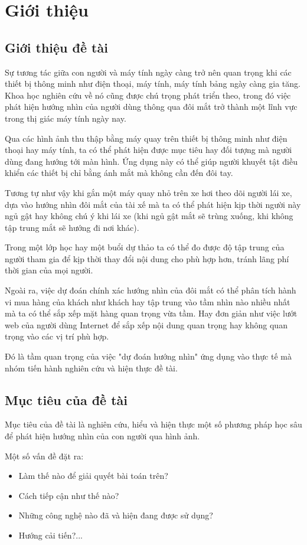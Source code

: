 \chapter {Giới thiệu}
	
\section{Giới thiệu đề tài}
Sự tương tác giữa con người và máy tính ngày càng trở nên quan trọng khi các thiết bị thông minh như điện thoại, máy tính, máy tính bảng ngày càng gia tăng. Khoa học nghiên cứu về nó cũng được chú trọng phát triển theo, trong đó việc phát hiện hướng nhìn của người dùng thông qua đôi mắt trở thành một lĩnh vực trong thị giác máy tính ngày nay.

Qua các hình ảnh thu thập bằng máy quay trên thiết bị thông minh như điện thoại hay máy tính, ta có thể phát hiện được mục tiêu hay đối tượng mà người dùng đang hướng tới màn hình. Ứng dụng này có thể giúp người khuyết tật điều khiển các thiết bị chỉ bằng ánh mắt mà không cần đến đôi tay.

Tương tự như vậy khi gắn một máy quay nhỏ trên xe hơi theo dõi người lái xe, dựa vào hướng nhìn đôi mắt của tài xế mà ta có thể phát hiện kịp thời người này ngủ gật hay không chú ý khi lái xe (khi  ngủ gật mắt sẽ trùng xuống, khi không tập trung mắt sẽ hướng đi nơi khác).

Trong một lớp học hay một buổi dự thảo ta có thể đo được độ tập trung của người tham gia để kịp thời thay đổi nội dung cho phù hợp hơn, tránh lãng phí thời gian của mọi người. 

Ngoài ra, việc dự đoán chính xác hướng nhìn của đôi mắt có thể phân tích hành vi mua hàng của khách như khách hay tập trung vào tầm nhìn nào nhiều nhất mà ta có thể sắp xếp mặt hàng quan trọng vừa tầm. Hay đơn giản như việc lướt web của người dùng Internet để sắp xếp nội dung quan trọng hay không quan trọng vào các vị trí phù hợp.

Đó là tầm quan trọng của việc "dự đoán hướng nhìn" ứng dụng vào thực tế mà nhóm tiến hành nghiên cứu và hiện thực đề tài.
\section{Mục tiêu của đề tài}
Mục tiêu của đề tài là nghiên cứu, hiểu và hiện thực một số phương pháp học sâu để phát hiện hướng nhìn của con người qua hình ảnh.

Một số vấn đề đặt ra: 
\begin{itemize}
\item Làm thế nào để giải quyết bài toán trên?
\item Cách tiếp cận như thế nào?
\item Những công nghệ nào đã và hiện đang được sử dụng?
\item Hướng cải tiến?...
\end{itemize}

